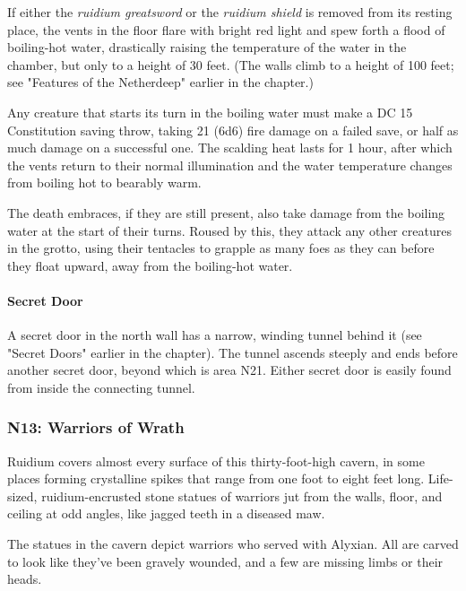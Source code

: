 \documentclass[a4paper, 11pt, bg=full, twocolumn, nooutline]{dndbook}
\begin{document}
If either the \textit{ruidium greatsword} or the \textit{ruidium shield} is removed from its resting place, the vents in the floor flare with bright red light and spew forth a flood of boiling-hot water, drastically raising the temperature of the water in the chamber, but only to a height of 30 feet. (The walls climb to a height of 100 feet; see "Features of the Netherdeep" earlier in the chapter.)

Any creature that starts its turn in the boiling water must make a DC 15 Constitution saving throw, taking 21 (6d6) fire damage on a failed save, or half as much damage on a successful one. The scalding heat lasts for 1 hour, after which the vents return to their normal illumination and the water temperature changes from boiling hot to bearably warm.

The death embraces, if they are still present, also take damage from the boiling water at the start of their turns. Roused by this, they attack any other creatures in the grotto, using their tentacles to grapple as many foes as they can before they float upward, away from the boiling-hot water.

\paragraph{Secret Door}

A secret door in the north wall has a narrow, winding tunnel behind it (see "Secret Doors" earlier in the chapter). The tunnel ascends steeply and ends before another secret door, beyond which is area N21. Either secret door is easily found from inside the connecting tunnel.

\subsubsection{N13: Warriors of Wrath}


\begin{DndReadAloud}
Ruidium covers almost every surface of this thirty-foot-high cavern, in some places forming crystalline spikes that range from one foot to eight feet long. Life-sized, ruidium-encrusted stone statues of warriors jut from the walls, floor, and ceiling at odd angles, like jagged teeth in a diseased maw.
\end{DndReadAloud}

The statues in the cavern depict warriors who served with Alyxian. All are carved to look like they've been gravely wounded, and a few are missing limbs or their heads.
\end{document}
